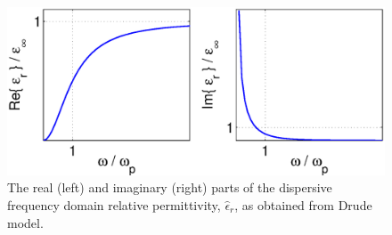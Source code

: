 \begin{figure}[htbp!]
\begin{center}
    \includegraphics[scale=0.7]{Figures/Chapters/PhysicalProblem/drudePermittivity}
\end{center}
\caption{The real (left) and imaginary (right) parts of the dispersive frequency domain relative permittivity, $\hat{\epsilon}_r$, as obtained from Drude model.}
\label{fig:read-and-imag-effective-permittivity}
\end{figure}


